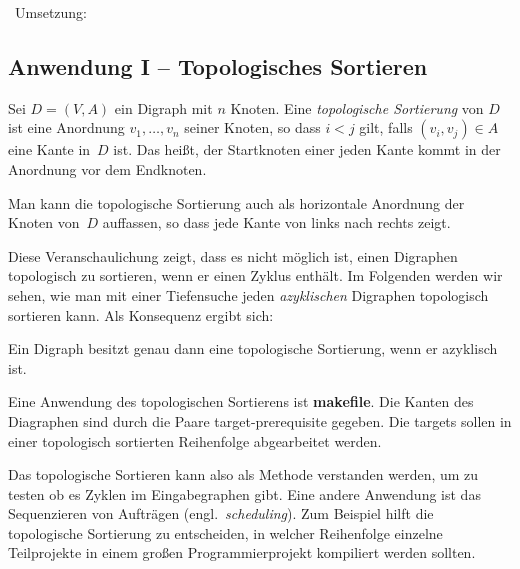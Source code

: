 \begin{bem}\ Umsetzung: 

\end{bem} 


\subsection{Anwendung I -- Topologisches Sortieren}

\begin{defn} 
Sei $D=(V,A)$ ein Digraph mit $n$ Knoten.
Eine \emph{topologische Sortierung} von $D$ ist eine Anordnung $v_1,\ldots,v_n$ seiner Knoten, so dass $i < j$ gilt, falls $(v_i,v_j) \in A$ eine Kante in~$D$ ist.
Das heißt, der Startknoten einer jeden Kante kommt in der Anordnung vor dem Endknoten.
\end{defn} 

\begin{bem}
Man kann die topologische Sortierung auch als horizontale Anordnung der Knoten von~$D$ auffassen, so dass jede Kante von links nach rechts zeigt.

Diese Veranschaulichung zeigt, dass es nicht möglich ist, einen Digraphen topologisch zu sortieren, wenn er einen Zyklus enthält.
Im Folgenden werden wir sehen, wie man mit einer Tiefensuche jeden \emph{azyklischen} Digraphen topologisch sortieren kann.
Als Konsequenz ergibt sich:
\end{bem} 

\begin{prop}
Ein Digraph besitzt genau dann eine topologische Sortierung, wenn er azyklisch ist.
\end{prop}

\begin{bem}
	Eine Anwendung des topologischen Sortierens ist \textbf{makefile}. Die Kanten des Diagraphen sind durch  die Paare target-prerequisite gegeben. Die targets sollen in einer topologisch sortierten Reihenfolge abgearbeitet werden. 
\end{bem} 


\begin{bem} 
Das topologische Sortieren kann also als Methode verstanden werden, um zu testen ob es Zyklen im Eingabegraphen gibt.
Eine andere Anwendung ist das Sequenzieren von Aufträgen (engl.~\emph{scheduling}).
Zum Beispiel hilft die topologische Sortierung zu entscheiden, in welcher Reihenfolge einzelne Teilprojekte in einem großen Programmierprojekt kompiliert werden sollten.
\end{bem} 



